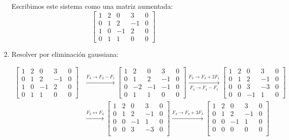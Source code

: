 \begin{enumerate}[label=\color{red}\textbf{\arabic*)}]
\begin{enumerate}[label=\arabic*)]
                Escribimos este sistema como una matriz aumentada: 
                \[
                    \begin{bmatrix}
                    1 & 2 & 0 & 3 & 0\\
                    0 & 1 & 2 & -1 & 0\\
                    1 & 0 & -1 & 2 & 0\\
                    0 & 1 & 1 & 0 & 0
                \end{bmatrix}
                \] 
            \item Resolver por eliminación gaussiana:

$\begin{aligned}\begin{bmatrix}
                    1 & 2 & 0 & 3 & 0\\
                    0 & 1 & 2 & -1 & 0\\
                    1 & 0 & -1 & 2 & 0\\
                    0 & 1 & 1 & 0 & 0
                \end{bmatrix}&\xrightarrow{F_3\to F_3-F_1}\begin{bmatrix}
                    1 & 2 & 0 & 3 & 0\\
                    0 & 1 & 2 & -1 & 0\\
                    0 & -2 & -1 & -1 & 0\\
                    0 & 1 & 1 & 0 & 0
                \end{bmatrix}\xrightarrow[F_4\to F_4-F_1]{F_3\to F_3+2F_1}\begin{bmatrix}
                    1 & 2 & 0 & 3 & 0\\
                    0 & 1 & 2 & -1 & 0\\
                    0 & 0 & 3 & -3 & 0\\
                    0 & 0 & -1 & 1 & 0
                \end{bmatrix}\\
&\xrightarrow{F_3\leftrightarrow F_4}\begin{bmatrix}
                    1 & 2 & 0 & 3 & 0\\
                    0 & 1 & 2 & -1 & 0\\
                    0 & 0 & -1 & 1 & 0\\
                    0 & 0 & 3 & -3 & 0\\
                \end{bmatrix}\xrightarrow{F_4\to F_4+3F_3}\begin{bmatrix}
                    1 & 2 & 0 & 3 & 0\\
                    0 & 1 & 2 & -1 & 0\\
                    0 & 0 & -1 & 1 & 0\\
                    0 & 0 & 0 & 0 & 0\\
                \end{bmatrix}\end{aligned}$


\end{enumerate}
\end{enumerate}
